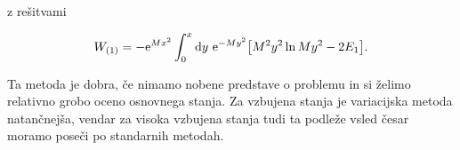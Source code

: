 \ni z re\v sitvami

\begin{equation}
	W_{(1)} = -\text{e}^{Mx^2} \int_0^x \text{d} y\ \text{e}^{-My^2}\big[M^2y^2 \ln My^2 - 2E_1\big].
\end{equation}

Ta metoda je dobra, \v ce nimamo nobene predstave o problemu in si \v zelimo relativno grobo oceno osnovnega stanja. Za vzbujena stanja
je variacijska metoda natan\v cnej\v sa, vendar za visoka vzbujena stanja tudi ta podle\v ze vsled \v cesar moramo pose\v ci po
standarnih metodah.

